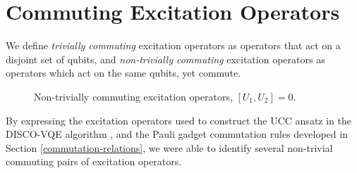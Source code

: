 \section{Commuting Excitation Operators}%
\label{operator-commutations}

We define \textit{trivially commuting} excitation operators as operators that act on a disjoint set of qubits, and \textit{non-trivially commuting} excitation operators as operators which act on the same qubits, yet commute.

\begin{figure}[H]
    \centering
    \caption{Non-trivially commuting excitation operators, $[U_1, U_2] = 0$.}
\end{figure}

By expressing the excitation operators used to construct the UCC ansatz in the DISCO-VQE algorithm \cite{Burton2023}, and the Pauli gadget commutation rules developed in Section \ref{commutation-relations}, we were able to identify several non-trivial commuting pairs of excitation operators.
